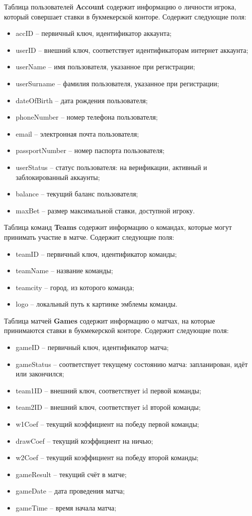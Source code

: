 Таблица пользователей \textbf{Account} содержит информацию о личности игрока, который совершает ставки в букмекерской конторе.
Содержит следующие поля:
\begin{itemize}
	\item accID -- первичный ключ, идентификатор аккаунта;
	\item userID -- внешний ключ, соответствует идентификаторам интернет аккаунта;
	\item userName -- имя пользователя, указанное при регистрации;
	\item userSurname -- фамилия пользователя, указанное при регистрации;
	\item dateOfBirth -- дата рождения пользователя;
	\item phoneNumber -- номер телефона пользователя;
	\item email -- электронная почта пользователя;
	\item passportNumber -- номер паспорта пользователя;
	\item userStatus -- статус пользователя: на верификации, активный и заблокированный аккаунты;
	\item balance -- текущий баланс пользователя;
	\item maxBet -- размер максимальной ставки, доступной игроку.
\end{itemize}

Таблица команд \textbf{Teams} содержит информацию о командах, которые могут принимать участие в матче.
Содержит следующие поля:
\begin{itemize}
	\item teamID -- первичный ключ, идентификатор команды;
	\item teamName -- название команды;
	\item teamcity -- город, из которого команда;
	\item logo -- локальный путь к картинке эмблемы команды.
\end{itemize}

Таблица матчей \textbf{Games} содержит информацию о матчах, на которые принимаются ставки в букмекерской конторе.
Содержит следующие поля:
\begin{itemize}
	\item gameID -- первичный ключ, идентификатор матча;
	\item gameStatus -- соответствует текущему состоянию матча: запланирован, идёт или закончился;
	\item team1ID -- внешний ключ, соответствует id первой команды;
	\item team2ID -- внешний ключ, соответствует id второй команды;
	\item w1Coef -- текущий коэффициент на победу первой команды;
	\item drawCoef -- текущий коэффициент на ничью;
	\item w2Coef -- текущий коэффициент на победу второй команды;
	\item gameResult -- текущий счёт в матче;
	\item gameDate -- дата проведения матча;
	\item gameTime -- время начала матча;
\end{itemize}

